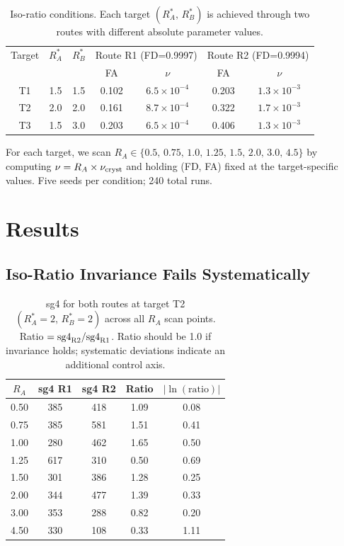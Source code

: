 \documentclass[11pt]{article}
\begin{document}
\begin{table}[h]
\centering
\caption{Iso-ratio conditions. Each target $(R_A^*,\,R_B^*)$ is achieved
through two routes with different absolute parameter values.}
\label{tab:conditions}
\small
\begin{tabular}{ccc|cc|cc}
\toprule
Target & $R_A^*$ & $R_B^*$ &
  \multicolumn{2}{c|}{Route R1 (FD=0.9997)} &
  \multicolumn{2}{c}{Route R2 (FD=0.9994)} \\
 & & & FA & $\nu$ & FA & $\nu$ \\
\midrule
T1 & 1.5 & 1.5 & 0.102 & $6.5\times10^{-4}$ & 0.203 & $1.3\times10^{-3}$ \\
T2 & 2.0 & 2.0 & 0.161 & $8.7\times10^{-4}$ & 0.322 & $1.7\times10^{-3}$ \\
T3 & 1.5 & 3.0 & 0.203 & $6.5\times10^{-4}$ & 0.406 & $1.3\times10^{-3}$ \\
\bottomrule
\end{tabular}
\end{table}

For each target, we scan $R_A \in \{0.5,\,0.75,\,1.0,\,1.25,\,1.5,\,2.0,\,3.0,\,4.5\}$
by computing $\nu = R_A \times \nu_{\rm cryst}$ and holding (FD, FA) fixed at
the target-specific values. Five seeds per condition; 240 total runs.

\section{Results}

\subsection{Iso-Ratio Invariance Fails Systematically}

\begin{table}[h]
\centering
\caption{sg4 for both routes at target T2 $(R_A^*=2,\, R_B^*=2)$ across all $R_A$ scan
points. Ratio $= \text{sg4}_{\rm R2}/\text{sg4}_{\rm R1}$. Ratio should be 1.0
if invariance holds; systematic deviations indicate an additional control axis.}
\label{tab:t2_results}
\small
\begin{tabular}{c|ccc|c}
\toprule
$R_A$ & sg4 R1 & sg4 R2 & Ratio & $|\ln(\text{ratio})|$ \\
\midrule
0.50 & 385 & 418 & 1.09 & 0.08 \\
0.75 & 385 & 581 & 1.51 & 0.41 \\
1.00 & 280 & 462 & 1.65 & 0.50 \\
1.25 & 617 & 310 & 0.50 & 0.69 \\
1.50 & 301 & 386 & 1.28 & 0.25 \\
2.00 & 344 & 477 & 1.39 & 0.33 \\
3.00 & 353 & 288 & 0.82 & 0.20 \\
4.50 & 330 & 108 & 0.33 & 1.11 \\
\bottomrule
\end{tabular}
\end{table}
\end{document}
